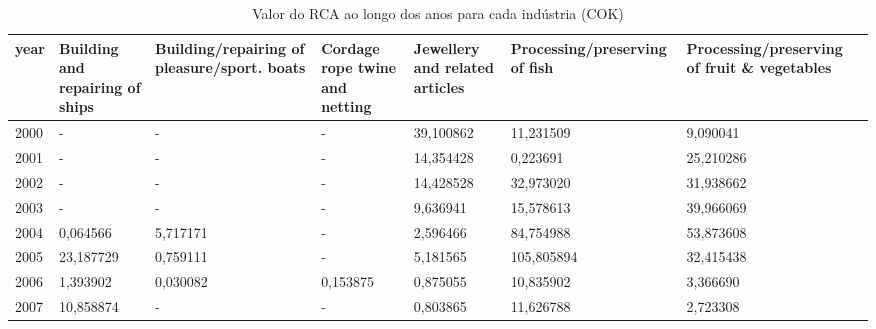 \begin{table}
\centering
\caption{Valor do RCA ao longo dos anos para cada indústria (COK)}
\begin{tabular}{p{1cm}p{2cm}p{2cm}p{2cm}p{2cm}p{2cm}p{2cm}}
\toprule
 year &  Building and repairing of ships &  Building/repairing of pleasure/sport. boats &  Cordage rope twine and netting &  Jewellery and related articles &  Processing/preserving of fish &  Processing/preserving of fruit \& vegetables \\
\midrule
 2000 &                                - &                                            - &                               - &                       39,100862 &                      11,231509 &                                     9,090041 \\
 2001 &                                - &                                            - &                               - &                       14,354428 &                       0,223691 &                                    25,210286 \\
 2002 &                                - &                                            - &                               - &                       14,428528 &                      32,973020 &                                    31,938662 \\
 2003 &                                - &                                            - &                               - &                        9,636941 &                      15,578613 &                                    39,966069 \\
 2004 &                         0,064566 &                                     5,717171 &                               - &                        2,596466 &                      84,754988 &                                    53,873608 \\
 2005 &                        23,187729 &                                     0,759111 &                               - &                        5,181565 &                     105,805894 &                                    32,415438 \\
 2006 &                         1,393902 &                                     0,030082 &                        0,153875 &                        0,875055 &                      10,835902 &                                     3,366690 \\
 2007 &                        10,858874 &                                            - &                               - &                        0,803865 &                      11,626788 &                                     2,723308 \\

\end{tabular}
\end{table}
